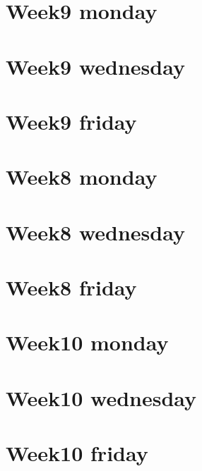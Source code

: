 
\section*{Week9 monday}

\vfill
\section*{Week9 wednesday}

\vfill
\section*{Week9 friday}

\vfill
\section*{Week8 monday}

\vfill
\section*{Week8 wednesday}

\vfill
\section*{Week8 friday}

\vfill
\section*{Week10 monday}

\vfill
\section*{Week10 wednesday}

\vfill
\section*{Week10 friday}

\vfill
